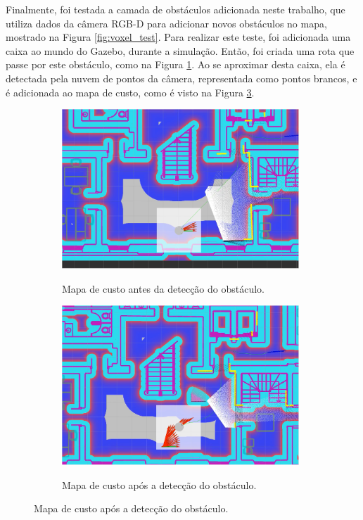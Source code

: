 \documentclass[repeatfields,xlists,xpacks,oneside,yearsonly]{ufrgscca}
\begin{document}
Finalmente, foi testada a camada de obstáculos adicionada neste
trabalho, que utiliza dados da câmera RGB-D para adicionar novos
obstáculos no mapa, mostrado na Figura \ref{fig:voxel_test}. Para
realizar este teste, foi adicionada uma caixa ao mundo do Gazebo,
durante a simulação. Então, foi criada uma rota que passe por este
obstáculo, como na Figura \ref{fig:voxel_before}. Ao se aproximar
desta caixa, ela é detectada pela nuvem de pontos da câmera,
representada como pontos brancos, e é adicionada ao mapa de custo,
como é visto na Figura \ref{fig:voxel_after}.

\begin{figure}[h]
    \caption{Mapeamento de obstáculos da camada \textit{voxel}}
    \label{fig:voxel_test}
    \begin{subfigure}{0.5\linewidth}
        {
            \centering
            \caption{Mapa de custo antes da detecção do obstáculo.}
            \label{fig:voxel_before}
            \includegraphics[width=0.98\textwidth]{costmap_voxel_before.png}\\
        }
    \end{subfigure}
    \begin{subfigure}{0.5\linewidth}
        {
            \centering
            \caption{Mapa de custo após a detecção do obstáculo.}
            \label{fig:voxel_after}
            \includegraphics[width=0.98\textwidth]{costmap_voxel_after.png}\\
        }
    \end{subfigure}
\end{figure}
\end{document}
